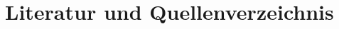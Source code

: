 \section{Literatur und Quellenverzeichnis}
\label{sec:references}

\printbibliography[heading=subbibliography,title={~}] %
